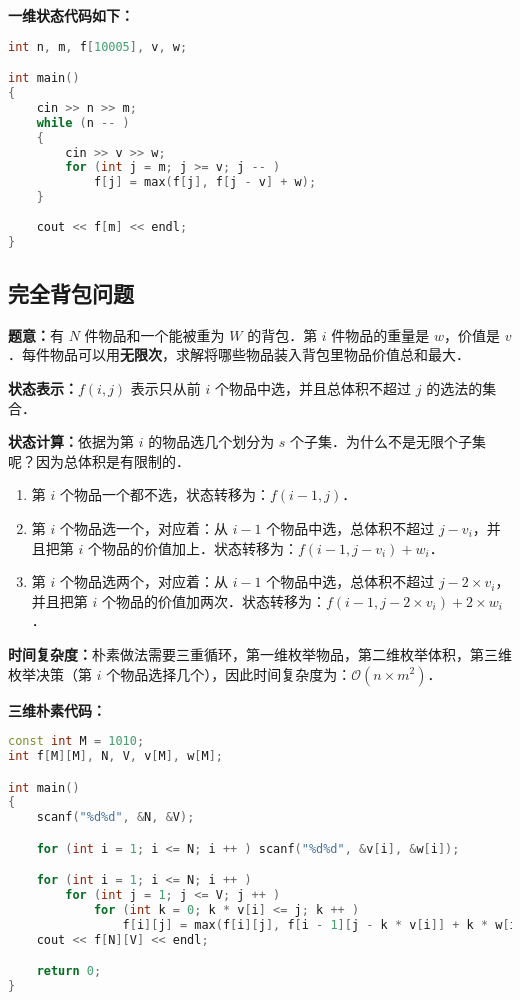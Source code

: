 \textbf{一维状态代码如下：}

\begin{lstlisting}[language=cpp]
int n, m, f[10005], v, w;

int main()
{
    cin >> n >> m;
    while (n -- )
    {
        cin >> v >> w;
        for (int j = m; j >= v; j -- )
            f[j] = max(f[j], f[j - v] + w);
    }
    
    cout << f[m] << endl;
}
\end{lstlisting}

\subsection{完全背包问题}

\textbf{题意：}有 $N$ 件物品和一个能被重为 $W$ 的背包．第 $i$ 件物品的重量是 $w$，价值是 $v$ ．每件物品可以用\textbf{无限次}，求解将哪些物品装入背包里物品价值总和最大．

\textbf{状态表示：}$f(i, j)$ 表示只从前 $i$ 个物品中选，并且总体积不超过 $j$ 的选法的集合．

\textbf{
状态计算：}依据为第 $i$ 的物品选几个划分为 $s$ 个子集．为什么不是无限个子集呢？因为总体积是有限制的．

\begin{enumerate}
\item 第 $i$ 个物品一个都不选，状态转移为：$f(i - 1, j)$．
\item 第 $i$ 个物品选一个，对应着：从 $i - 1$ 个物品中选，总体积不超过 $j - v_i$，并且把第 $i$ 个物品的价值加上．状态转移为：$f(i - 1, j - v_i) + w_i$．
\item 第 $i$ 个物品选两个，对应着：从 $i - 1$ 个物品中选，总体积不超过 $j - 2 \times v_i$，并且把第 $i$ 个物品的价值加两次．状态转移为：$f(i - 1, j - 2 \times v_i) + 2 \times w_i$．
\end{enumerate}

\textbf{时间复杂度：}朴素做法需要三重循环，第一维枚举物品，第二维枚举体积，第三维枚举决策（第 $i$ 个物品选择几个），因此时间复杂度为：$\mathcal{O}(n \times m^2)$．

\textbf{三维朴素代码：}

\begin{lstlisting}[language=cpp]
const int M = 1010;
int f[M][M], N, V, v[M], w[M];

int main()
{
    scanf("%d%d", &N, &V);

    for (int i = 1; i <= N; i ++ ) scanf("%d%d", &v[i], &w[i]);

    for (int i = 1; i <= N; i ++ ) 
        for (int j = 1; j <= V; j ++ ) 
            for (int k = 0; k * v[i] <= j; k ++ )
                f[i][j] = max(f[i][j], f[i - 1][j - k * v[i]] + k * w[i]);
    cout << f[N][V] << endl;

    return 0;
}
\end{lstlisting}

